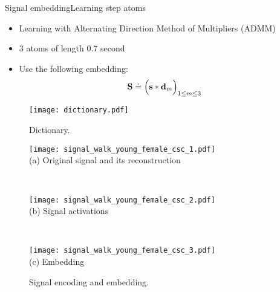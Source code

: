 \begin{frame}{Signal embedding}{Learning step atoms}

\renewcommand{\ratio}{0.9}
\centering
\begin{minipage}[t]{0.45\linewidth}
\begin{itemize}
    \item Learning with Alternating Direction Method of Multipliers (ADMM) \cite{bristow2013fast}
        \item 3 atoms of length 0.7 second

    \pause[3]
    \item Use the following embedding:
\begin{equation*}\label{eq: convolutional embedding}
\mathbf{S} \doteq \Big( \mathbf{s} * \mathbf{d}_m\Big)_{1 \le m \le 3 }
\end{equation*}
        
\end{itemize}

    \centering
    \begin{figure}
    \texttt{[image: dictionary.pdf]}
    \caption{Dictionary.}
    \end{figure}
\end{minipage}
\begin{minipage}[t]{0.54\linewidth}
    \pause
    \begin{figure}
        \begin{minipage}{\linewidth}
            \centering
            \texttt{[image: signal\_walk\_young\_female\_csc\_1.pdf]}\\
            {\small (a)\; Original signal and its reconstruction}
        \end{minipage}\\
        \begin{minipage}{\linewidth}
            \centering
            \texttt{[image: signal\_walk\_young\_female\_csc\_2.pdf]}\\
            {\small (b)\; Signal activations}
        \end{minipage}\\
        \begin{minipage}{\linewidth}
            \centering
            \texttt{[image: signal\_walk\_young\_female\_csc\_3.pdf]}\\
            {\small (c)\; Embedding}
        \end{minipage}
        \caption{Signal encoding and embedding.}
    \end{figure}
\end{minipage}

\end{frame}




